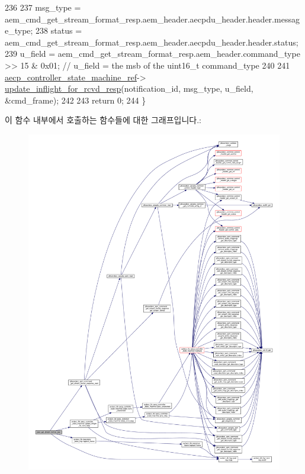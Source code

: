 \begin{DoxyCode}
236 
237     msg\_type = aem\_cmd\_get\_stream\_format\_resp.aem\_header.aecpdu\_header.header.message\_type;
238     status = aem\_cmd\_get\_stream\_format\_resp.aem\_header.aecpdu\_header.header.status;
239     u\_field = aem\_cmd\_get\_stream\_format\_resp.aem\_header.command\_type >> 15 & 0x01; \textcolor{comment}{// u\_field = the msb of
       the uint16\_t command\_type}
240 
241     \hyperlink{namespaceavdecc__lib_a0b1b5aea3c0490f77cbfd9178af5be22}{aecp\_controller\_state\_machine\_ref}->
      \hyperlink{classavdecc__lib_1_1aecp__controller__state__machine_a997abd9786c330a5505e903e6443208e}{update\_inflight\_for\_rcvd\_resp}(notification\_id, msg\_type, u\_field, &cmd\_frame);
242 
243     \textcolor{keywordflow}{return} 0;
244 \}
\end{DoxyCode}


이 함수 내부에서 호출하는 함수들에 대한 그래프입니다.\+:
\nopagebreak
\begin{figure}[H]
\begin{center}
\leavevmode
\includegraphics[width=350pt]{classavdecc__lib_1_1stream__output__descriptor__imp_a14f4051747c7470766410b64a8dfef84_cgraph}
\end{center}
\end{figure}




